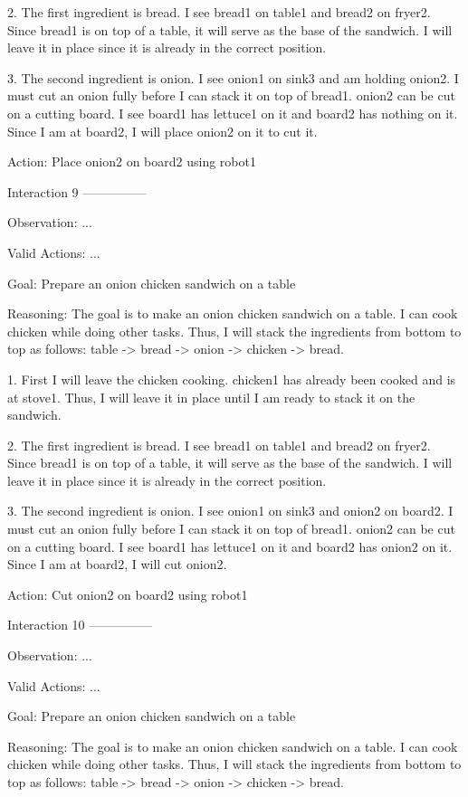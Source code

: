 2. The first ingredient is bread. I see bread1 on table1 and bread2 on fryer2. Since bread1 is on top of a table, it will serve as the base of the sandwich. I will leave it in place since it is already in the correct position.

3. The second ingredient is onion. I see onion1 on sink3 and am holding onion2. I must cut an onion fully before I can stack it on top of bread1. onion2 can be cut on a cutting board. I see board1 has lettuce1 on it and board2 has nothing on it. Since I am at board2, I will place onion2 on it to cut it.

Action: Place onion2 on board2 using robot1


Interaction 9
---------------


Observation: ...

Valid Actions: ...

Goal: Prepare an onion chicken sandwich on a table


Reasoning: The goal is to make an onion chicken sandwich on a table. I can cook chicken while doing other tasks. Thus, I
will stack the ingredients from bottom to top as follows: table -> bread -> onion -> chicken -> bread.

1. First I will leave the chicken cooking. chicken1 has already been cooked and is at stove1. Thus, I will leave it in place until I am ready to stack it on the sandwich.

2. The first ingredient is bread. I see bread1 on table1 and bread2 on fryer2. Since bread1 is on top of a table, it will serve as the base of the sandwich. I will leave it in place since it is already in the correct position.

3. The second ingredient is onion. I see onion1 on sink3 and onion2 on board2. I must cut an onion fully before I can stack it on top of bread1. onion2 can be cut on a cutting board. I see board1 has lettuce1 on it and board2 has onion2 on it. Since I am at board2, I will cut onion2.

Action: Cut onion2 on board2 using robot1


Interaction 10
---------------


Observation: ...

Valid Actions: ...

Goal: Prepare an onion chicken sandwich on a table


Reasoning: The goal is to make an onion chicken sandwich on a table. I can cook chicken while doing other tasks. Thus, I
will stack the ingredients from bottom to top as follows: table -> bread -> onion -> chicken -> bread.


